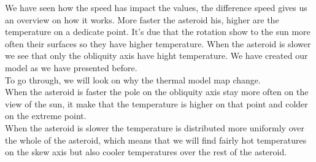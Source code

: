 We have seen how the speed has impact the values, the difference speed gives us an overview on how it works.
More faster the asteroid his, higher are the temperature on a dedicate point. It's due that the rotation show to the sun more often their surfaces so they have higher temperature.
When the asteroid is slower we see that only the obliquity axis have hight temperature. We have created our model as we have presented before. \\[10pt]
To go through, we will look on why the thermal model map change.\\ [10pt]
When the asteroid is faster the pole on the obliquity axis stay more often on the view of the sun, it make that the temperature is higher on that point and colder on the extreme point.\\ [10pt]
When the asteroid is slower the temperature is distributed more uniformly over the whole of the asteroid, which means that we will find fairly hot temperatures on the skew axis but also cooler temperatures over the rest of the asteroid.\\[10pt]
